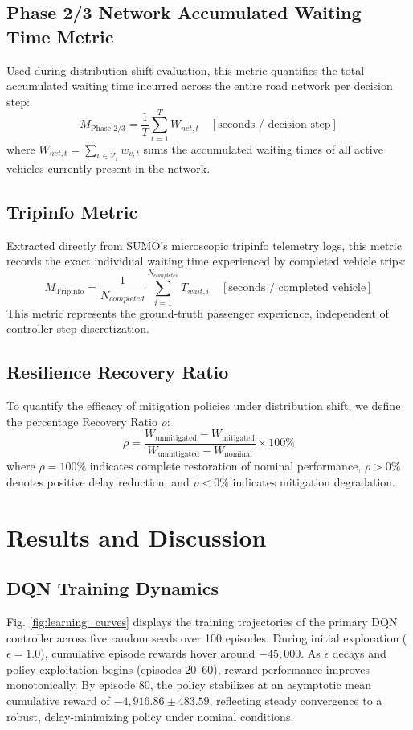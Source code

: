 \documentclass{ieeeaccess}
\begin{document}
\subsection{Phase 2/3 Network Accumulated Waiting Time Metric}
Used during distribution shift evaluation, this metric quantifies the total accumulated waiting time incurred across the entire road network per decision step:
\begin{equation}
M_{\text{Phase 2/3}} = \frac{1}{T} \sum_{t=1}^T W_{net, t} \quad [\text{seconds / decision step}]
\end{equation}
where $W_{net, t} = \sum_{v \in \mathcal{V}_t} w_{v, t}$ sums the accumulated waiting times of all active vehicles currently present in the network.

\subsection{Tripinfo Metric}
Extracted directly from SUMO's microscopic tripinfo telemetry logs, this metric records the exact individual waiting time experienced by completed vehicle trips:
\begin{equation}
M_{\text{Tripinfo}} = \frac{1}{N_{completed}} \sum_{i=1}^{N_{completed}} T_{wait, i} \quad [\text{seconds / completed vehicle}]
\end{equation}
This metric represents the ground-truth passenger experience, independent of controller step discretization.

\subsection{Resilience Recovery Ratio}
To quantify the efficacy of mitigation policies under distribution shift, we define the percentage Recovery Ratio $\rho$:
\begin{equation}
\rho = \frac{W_{\text{unmitigated}} - W_{\text{mitigated}}}{W_{\text{unmitigated}} - W_{\text{nominal}}} \times 100\%
\end{equation}
where $\rho = 100\%$ indicates complete restoration of nominal performance, $\rho > 0\%$ denotes positive delay reduction, and $\rho < 0\%$ indicates mitigation degradation.

\section{Results and Discussion}
\label{sec:results}

\subsection{DQN Training Dynamics}
Fig. \ref{fig:learning_curves} displays the training trajectories of the primary DQN controller across five random seeds over 100 episodes. During initial exploration ($\epsilon = 1.0$), cumulative episode rewards hover around $-45,000$. As $\epsilon$ decays and policy exploitation begins (episodes 20--60), reward performance improves monotonically. By episode 80, the policy stabilizes at an asymptotic mean cumulative reward of $-4,916.86 \pm 483.59$, reflecting steady convergence to a robust, delay-minimizing policy under nominal conditions.
\end{document}

